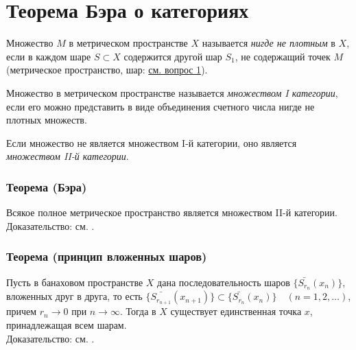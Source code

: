\section{Теорема Бэра о категориях}
Множество $M$ в метрическом пространстве $X$ называется \textit{нигде не плотным} в $X$, если в каждом шаре $S \subset X$ содержится другой шар $S_1$, не содержащий точек $M$ (метрическое пространство, шар: \hyperref[sec:q-1]{см. вопрос 1}).

Множество в метрическом пространстве называется \textit{множеством I категории}, если его можно представить в виде объединения счетного числа нигде не плотных множеств.

Если множество не является множеством I-й категории, оно является \textit{множеством II-й категории}.

\subsubsection*{Теорема (Бэра)} 
Всякое полное метрическое пространство является множеством II-й категории.\\
Доказательство: см. \cite[с.~49]{trenogin}.

\subsubsection*{Теорема (принцип вложенных шаров)}
Пусть в банаховом пространстве $X$ дана последовательность шаров $\{\bar{S_{r_n}}(x_n)\}$, вложенных друг в друга, то есть $\{\bar{S_{r_{n + 1}}}(x_{n + 1})\} \subset \{\bar{S_{r_n}}(x_n)\} \quad (n = 1, 2, \dots)$, причем $r_n \to 0$ при $n \to \infty$. Тогда в $X$ существует единственная точка $x$, принадлежащая всем шарам.\\
Доказательство:  см. \cite[с.~49]{trenogin}.